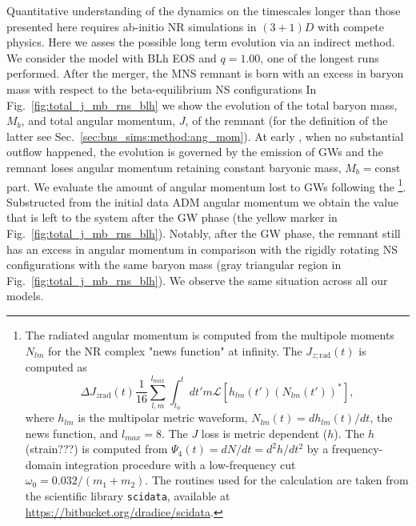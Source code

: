 Quantitative understanding of the \pmerg{} dynamics on the timescales 
longer than those presented here requires ab-initio \ac{NR} simulations in 
$(3+1)D$ with compete physics.
%
Here we asses the possible long term evolution via an indirect method.
We consider the model with BLh \ac{EOS} and $q=1.00$, one of the longest runs 
performed. 
%
After the merger, the \ac{MNS} remnant is born with an excess in baryon mass
with respect to the beta-equilibrium \ac{NS} configurations
%
In Fig.~\ref{fig:total_j_mb_rns_blh} we show the evolution of the 
total baryon mass, $M_b$, and total angular momentum, $J$, of the remnant
(for the definition of the latter see Sec.~\ref{sec:bns_sims:method:ang_mom}).
%
At early \pmerg{}, when no substantial outflow happened, the 
evolution is governed by the emission of \acp{GW} and the remnant loses 
angular momentum retaining constant baryonic mass, $M_b=\text{const}$ part.
%
We evaluate the amount of angular momentum lost to \acp{GW} following the 
\citet{Damour:2011fu,Bernuzzi:2012ci,Bernuzzi:2015rla}\footnote{
    The radiated angular momentum is computed from the 
    multipole moments $N_{lm}$ for the \ac{NR} complex "news function" at infinity. 
    The $J_{z;\text{rad}}(t)$ is computed as \citep{Damour:2011fu} 
    \begin{equation*}
    \Delta J_{z\text{rad}}(t) \frac{1}{16}\sum_{l,m}^{l_{max}}\int_{t_0}^{t} dt' m \mathcal{L}[h_{lm}(t')(N_{lm}(t'))^*],
    \end{equation*}
    where $h_{lm}$ is the multipolar metric waveform, 
    $N_{lm}(t) = dh_{lm}(t) / dt$, the news function, and $l_{max}=8$.
    The $J$ loss is metric dependent ($h$).
    The $h$ (strain???) is computed from $\Psi_4(t) = dN/dt = d^2h/dt^2$ by a 
    frequency-domain integration procedure with a low-frequency cut 
    $\omega_0 = 0.032/(m_1+m_2)$.
    The routines used for the calculation are taken from the scientific library
    \texttt{scidata}, available at \url{https://bitbucket.org/dradice/scidata}.
}.
%
Substructed from the initial data \ac{ADM} angular momentum  
we obtain the value that is left to the system after the \ac{GW} phase 
(the yellow marker in Fig.~\ref{fig:total_j_mb_rns_blh}).
%
Notably, after the \ac{GW} phase, the remnant still has an excess in angular momentum
in comparison with the rigidly rotating \ac{NS} configurations with the same baryon mass 
(gray triangular region in Fig.~\ref{fig:total_j_mb_rns_blh}).
%
We observe the same situation across all our models.%


